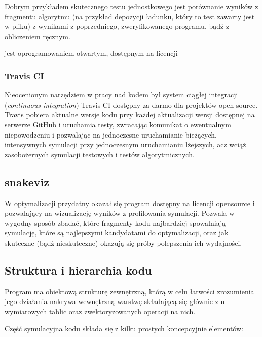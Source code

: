     Dobrym przykładem skutecznego testu jednostkowego jest porównanie wyników z
    fragmentu algorytmu (na przykład depozycji ładunku, który to test zawarty
    jest w pliku) 
     z wynikami z poprzedniego, zweryfikowanego
    programu, bądź z obliczeniem ręcznym.

     jest oprogramowaniem otwartym, dostępnym na licencji

    \subsubsection{Travis CI}
    Nieocenionym narzędziem w pracy nad kodem był system ciągłej integracji
    (\emph{continuous integration}) Travis CI  dostępny za
    darmo dla projektów open-source. Travis pobiera aktualne wersje kodu przy
    każdej aktualizacji wersji dostępnej na serwerze GitHub i uruchamia testy,
    zwracając komunikat o ewentualnym niepowodzeniu i pozwalając na jednoczesne
    uruchamianie bieżących, intensywnych symulacji przy jednoczesnym
    uruchamianiu lżejszych, acz wciąż zasobożernych 
    symulacji testowych i testów algorytmicznych.

    \subsection{snakeviz} W optymalizacji przydatny okazał się program
     dostępny na licencji opensource i pozwalający na
    wizualizację wyników z profilowania symulacji. Pozwala w wygodny sposób
    zbadać, które fragmenty kodu najbardziej spowalniają symulację, które są
    najlepszymi kandydatami do optymalizacji, oraz jak skuteczne (bądź
    nieskuteczne) okazują się próby polepszenia ich wydajności.
     

    \subsection{Struktura i hierarchia kodu}

    Program ma obiektową strukturę zewnętrzną, którą w celu łatwości
    zrozumienia jego działania nakrywa wewnętrzną warstwę składającą się
    głównie z n-wymiarowych tablic  oraz zwektoryzowanych
    operacji na nich.

    Część symulacyjna kodu składa się z kilku prostych koncepcyjnie elementów:

